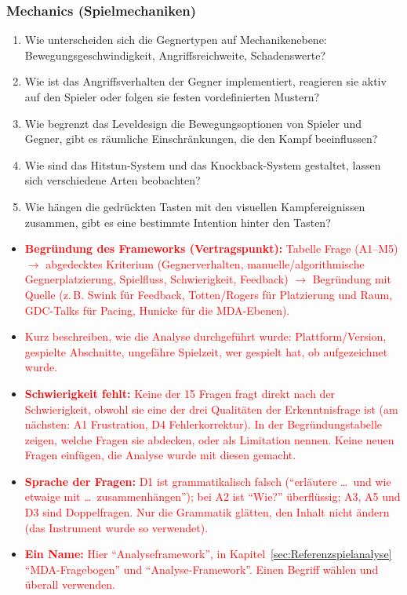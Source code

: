 \documentclass[../Main.tex]{subfiles}
\begin{document}
\subsubsection{Mechanics (Spielmechaniken)}

\begin{enumerate}[label=\textbf{M\arabic*}, leftmargin=1.5cm, itemsep=0.5em]
    \item Wie unterscheiden sich die Gegnertypen auf Mechanikenebene: Bewegungsgeschwindigkeit, Angriffsreichweite, Schadenswerte?
    \item Wie ist das Angriffsverhalten der Gegner implementiert, reagieren sie aktiv auf den Spieler oder folgen sie festen vordefinierten Mustern?
    \item Wie begrenzt das Leveldesign die Bewegungsoptionen von Spieler und Gegner, gibt es räumliche Einschränkungen, die den Kampf beeinflussen?
    \item Wie sind das Hitstun-System und das Knockback-System gestaltet, lassen sich verschiedene Arten beobachten?
    \item Wie hängen die gedrückten Tasten mit den visuellen Kampfereignissen zusammen, gibt es eine bestimmte Intention hinter den Tasten?
\end{enumerate}

\begin{itemize}[leftmargin=1.5cm]
    \item \textcolor{red}{\textbf{Begründung des Frameworks (Vertragspunkt):} Tabelle Frage (A1--M5) $\rightarrow$ abgedecktes Kriterium (Gegnerverhalten, manuelle/algorithmische Gegnerplatzierung, Spielfluss, Schwierigkeit, Feedback) $\rightarrow$ Begründung mit Quelle (z.\,B. Swink für Feedback, Totten/Rogers für Platzierung und Raum, GDC-Talks für Pacing, Hunicke für die MDA-Ebenen).}
    \item \textcolor{red}{Kurz beschreiben, wie die Analyse durchgeführt wurde: Plattform/Version, gespielte Abschnitte, ungefähre Spielzeit, wer gespielt hat, ob aufgezeichnet wurde.}
    \item \textcolor{red}{\textbf{Schwierigkeit fehlt:} Keine der 15 Fragen fragt direkt nach der Schwierigkeit, obwohl sie eine der drei Qualitäten der Erkenntnisfrage ist (am nächsten: A1 Frustration, D4 Fehlerkorrektur). In der Begründungstabelle zeigen, welche Fragen sie abdecken, oder als Limitation nennen. Keine neuen Fragen einfügen, die Analyse wurde mit diesen gemacht.}
    \item \textcolor{red}{\textbf{Sprache der Fragen:} D1 ist grammatikalisch falsch (\enquote{erläutere \ldots\ und wie etwaige mit \ldots\ zusammenhängen}); bei A2 ist \enquote{Wie?} überflüssig; A3, A5 und D3 sind Doppelfragen. Nur die Grammatik glätten, den Inhalt nicht ändern (das Instrument wurde so verwendet).}
    \item \textcolor{red}{\textbf{Ein Name:} Hier \enquote{Analyseframework}, in Kapitel~\ref{sec:Referenzspielanalyse} \enquote{MDA-Fragebogen} und \enquote{Analyse-Framework}. Einen Begriff wählen und überall verwenden.}
\end{itemize}
\end{document}
